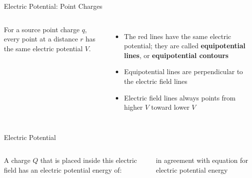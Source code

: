 \documentclass[12pt,aspectratio=169]{beamer}
\begin{document}
\begin{frame}{Electric Potential: Point Charges}
  \begin{columns}
    \centering
 
    For a source point charge $q$, every point at a distance $r$ has the same
    electric potential $V$.
    \begin{itemize}
    \item The red lines have the same electric potential; they are called
      \textbf{equipotential lines}, or \textbf{equipotential contours}
    \item Equipotential lines are perpendicular to the electric field lines
    \item Electric field lines always points from higher $V$ toward lower $V$

    \end{itemize}
  \end{columns}
\end{frame}



\begin{frame}{Electric Potential}
  \begin{columns}
    \centering
    
    A charge $Q$ that is placed inside this electric field has an electric
    potential energy of:


    in agreement with equation for electric potential energy
  \end{columns}
\end{frame}
\end{document}
